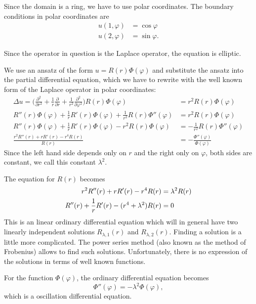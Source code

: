 \begin{loesung}
Since the domain is a ring, we have to use polar coordinates.
The boundary conditions in polar coordinates are 
\[
\begin{aligned}
u(1,\varphi) &= \cos\varphi\\
u(2,\varphi) &= \sin\varphi.
\end{aligned}
\]
\begin{teilaufgaben}
\item
Since the operator in question is the Laplace operator, the equation is
elliptic.
\item
We use an ansatz of the form $u=R(r)\Phi(\varphi)$
and substitute the ansatz into the partial differential equation, which
we have to rewrite with the well known form of the Laplace operator
in polar coordinates:
\begin{align*}
\Delta u
=
\biggl(
\frac{\partial^2}{\partial r^2}
+
\frac1r\frac{\partial}{\partial r}
+
\frac1{r^2}\frac{\partial^2}{\partial\varphi^2}
\biggr)
R(r)\Phi(\varphi)
&=
r^2R(r)\Phi(\varphi)
\\
R''(r)\Phi(\varphi)
+\frac1r R'(r)\Phi(\varphi)
+\frac1{r^2} R(r)\Phi''(\varphi)
&=r^2R(r)\Phi(\varphi)
\\
R''(r)\Phi(\varphi)
+\frac1r R'(r)\Phi(\varphi)
-r^2R(r)\Phi(\varphi)
&=
-\frac1{r^2} R(r)\Phi''(\varphi)
\\
\frac{r^2R''(r)+rR'(r)-r^4R(r)}{R(r)}
&=
-\frac{\Phi''(\varphi)}{\Phi(\varphi)}
\end{align*}
Since the left hand side depends only on $r$ and the right only on $\varphi$,
both sides are constant, we call this constant $\lambda^2$.

The equation for $R(r)$ becomes
\begin{align}
r^2R''(r) + rR'(r) -r^4R(r) &= \lambda^2 R(r)
\notag
\\
R''(r) + \frac1rR'(r) - (r^4+\lambda^2) R(r) &=0
\label{40000024:Rdiff}
\end{align}
This is an linear ordinary differential equation which will in general
have two linearly independent solutions $R_{\lambda,1}(r)$ and
$R_{\lambda,2}(r)$.
Finding a solution is a little more complicated.
The power series method (also known as the method of Frobenius)
allows to find such solutions.
Unfortunately, there is no expression of the solutions in terms of
well known functions.

For the function $\Phi(\varphi)$, the ordinary differential equation becomes
\begin{equation}
\Phi''(\varphi) = -\lambda^2\Phi(\varphi),
\label{40000024:phieqn}
\end{equation}
which is a oscillation differential equation.


\end{teilaufgaben}
\end{loesung}
